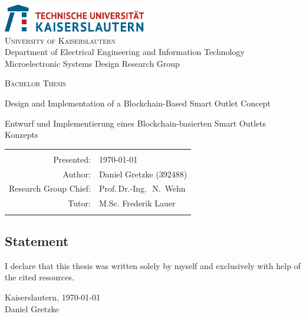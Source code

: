 \begin{titlepage}
\setcounter{page}{1}
\begin{center}
\includegraphics*[scale=2.5]{img/TUKL_LOGO.pdf}\\[3ex]

\textsc{\Large University of Kaiserslautern}\\[1.5ex]
Department of Electrical Engineering and Information Technology\\[1.5ex]
Microelectronic Systems Design Research Group \\[3ex]

\vfill
\vfill

\textsc{\Huge Bachelor Thesis}\\[6ex]
\centerline{\Large Design and Implementation of a Blockchain-Based Smart Outlet Concept}
\vspace{20pt}
\centerline{\Large Entwurf und Implementierung eines Blockchain-basierten Smart Outlets Konzepts}

\vfill
\vfill

 \begin{tabular}{rl}\hline\\
 Presented:                & \quad \today \\[1.5ex]
 Author:                   & \quad Daniel Gretzke (392488) \\[1.5ex]
 Research Group Chief:     & \quad Prof.\,Dr.-Ing.\,~N.~Wehn\\[1.5ex]
 Tutor:                    & \quad M.Sc. Frederik Lauer\\[1.5ex]\\\hline
 \end{tabular}
\end{center}

    \clearpage
    \pagestyle{empty}
    \begin{flushleft}
    \section*{Statement}
    \vspace{10mm}
    I declare that this thesis was written solely by myself and exclusively with
    help of the cited resources.

    \vspace{12pt}
    Kaiserslautern, \today \\
    \vspace{20mm}
    Daniel Gretzke
    \end{flushleft}

\end{titlepage}


